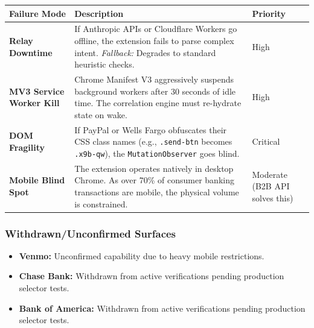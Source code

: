 \documentclass[
]{article}
\newcounter{none} %
\providecommand{\tightlist}{%
  \setlength{\itemsep}{0pt}\setlength{\parskip}{0pt}}
\begin{document}
{\def\LTcaptype{none} %
\begin{longtable}[]{@{}
  >{\raggedright\arraybackslash}p{}
  >{\raggedright\arraybackslash}p{}
  >{\raggedright\arraybackslash}p{}@{}}
\toprule\noalign{}
\begin{minipage}[b]{\linewidth}\raggedright
Failure Mode
\end{minipage} & \begin{minipage}[b]{\linewidth}\raggedright
Description
\end{minipage} & \begin{minipage}[b]{\linewidth}\raggedright
Priority
\end{minipage} \\
\midrule\noalign{}
\endhead
\bottomrule\noalign{}
\endlastfoot
\textbf{Relay Downtime} & If Anthropic APIs or Cloudflare Workers go
offline, the extension fails to parse complex intent. \emph{Fallback:}
Degrades to standard heuristic checks. & High \\
\textbf{MV3 Service Worker Kill} & Chrome Manifest V3 aggressively
suspends background workers after 30 seconds of idle time. The
correlation engine must re-hydrate state on wake. & High \\
\textbf{DOM Fragility} & If PayPal or Wells Fargo obfuscates their CSS
class names (e.g., \texttt{.send-btn} becomes \texttt{.x9b-qw}), the
\texttt{MutationObserver} goes blind. & Critical \\
\textbf{Mobile Blind Spot} & The extension operates natively in desktop
Chrome. As over 70\% of consumer banking transactions are mobile, the
physical volume is constrained. & Moderate (B2B API solves this) \\
\end{longtable}
}

\subsubsection{Withdrawn/Unconfirmed
Surfaces}\label{withdrawnunconfirmed-surfaces}

\begin{itemize}
\tightlist
\item
  \textbf{Venmo:} Unconfirmed capability due to heavy mobile
  restrictions.
\item
  \textbf{Chase Bank:} Withdrawn from active verifications pending
  production selector tests.
\item
  \textbf{Bank of America:} Withdrawn from active verifications pending
  production selector tests.
\end{itemize}
\end{document}
